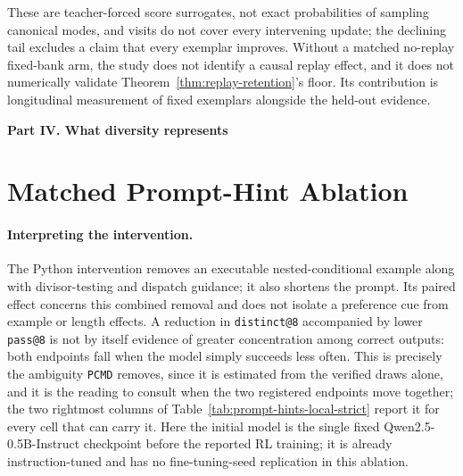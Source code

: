 \documentclass{article}
\newcommand{\1}{\mathbf 1}
\newcommand{\pmd}{\texttt{PCMD}}
\theoremstyle{remark}
\theoremstyle{definition}
\theoremstyle{plain}
\begin{document}
These are teacher-forced score surrogates, not exact probabilities of sampling
canonical modes, and visits do not cover every intervening update; the
declining tail excludes a claim that every exemplar improves. Without a matched
no-replay fixed-bank arm, the study does not identify a causal replay effect,
and it does not numerically validate
Theorem~\ref{thm:replay-retention}'s floor. Its contribution is longitudinal
measurement of fixed exemplars alongside the held-out evidence.

\clearpage
{}
\begin{center}\large\textbf{Part IV. What diversity represents}\end{center}

\section{Matched Prompt-Hint Ablation}
\label{app:prompt-hint-ablation}



\paragraph{Interpreting the intervention.}
The Python intervention removes an executable nested-conditional example
along with divisor-testing and dispatch guidance; it also shortens the prompt.
Its paired effect concerns this combined removal and does not isolate a
preference cue from example or length effects. A reduction in
\texttt{distinct@8} accompanied by lower \texttt{pass@8} is not by itself
evidence of greater concentration among correct outputs: both endpoints fall
when the model simply succeeds less often. This is precisely the ambiguity
\pmd{} removes, since it is estimated from the verified draws alone, and it is
the reading to consult when the two registered endpoints move together; the two
rightmost columns of Table~\ref{tab:prompt-hints-local-strict} report it for
every cell that can carry it.
Here the initial model is the single fixed Qwen2.5-0.5B-Instruct checkpoint
before the reported RL training; it is already instruction-tuned and has no
fine-tuning-seed replication in this ablation.
\end{document}
